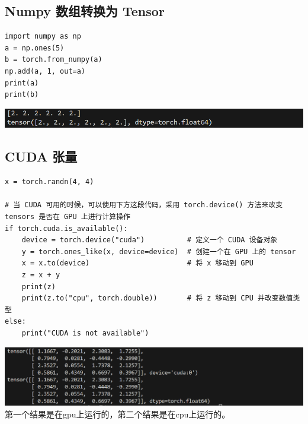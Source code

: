 \documentclass[UTF8,a4paper]{ctexart}
\begin{document}
\subsection{Numpy 数组转换为 Tensor}
\begin{lstlisting}
import numpy as np
a = np.ones(5)
b = torch.from_numpy(a)
np.add(a, 1, out=a)
print(a)
print(b)
\end{lstlisting}
\includegraphics[width=1\textwidth]{./pictures/tensor6.png}
\subsection{CUDA 张量}
\begin{lstlisting}
x = torch.randn(4, 4)

# 当 CUDA 可用的时候，可以使用下方这段代码，采用 torch.device() 方法来改变 tensors 是否在 GPU 上进行计算操作
if torch.cuda.is_available():
    device = torch.device("cuda")          # 定义一个 CUDA 设备对象
    y = torch.ones_like(x, device=device)  # 创建一个在 GPU 上的 tensor
    x = x.to(device)                       # 将 x 移动到 GPU
    z = x + y
    print(z)
    print(z.to("cpu", torch.double))       # 将 z 移动到 CPU 并改变数值类型
else:
    print("CUDA is not available")
\end{lstlisting}
\includegraphics[width=1\textwidth]{./pictures/tensor7.png}
第一个结果是在gpu上运行的，第二个结果是在cpu上运行的。
\end{document}
